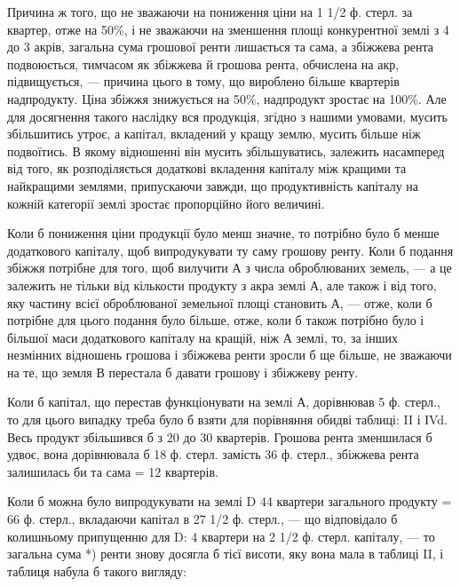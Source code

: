 Причина ж того, що не зважаючи на пониження ціни на 1 1/2 ф. стерл.
за квартер, отже на 50\%, і не зважаючи на зменшення площі конкурентної
землі з 4 до 3 акрів, загальна сума грошової ренти лишається та сама, а збіжжева
рента подвоюється, тимчасом як збіжжева й грошова рента, обчислена на акр, підвищується,
— причина цього в тому, що вироблено більше квартерів надпродукту.
Ціна збіжжя знижується на 50\%, надпродукт зростає на 100\%.
Але для досягнення такого наслідку вся продукція, згідно з нашими умовами,
мусить збільшитись утроє, а капітал, вкладений у кращу землю, мусить більше
ніж подвоїтись. В якому відношенні він мусить збільшуватись, залежить насамперед
від того, як розподіляється додаткові вкладення капіталу між кращими та
найкращими землями, припускаючи завжди, що продуктивність капіталу на
кожній категорії землі зростає пропорційно його величині.

Коли б пониження ціни продукції було менш значне, то потрібно було б
менше додаткового капіталу, щоб випродукувати ту саму грошову ренту. Коли б
подання збіжжя потрібне для того, щоб вилучити А з числа оброблюваних земель,
— а це залежить не тільки від кількости продукту з акра землі А, але
також і від того, яку частину всієї оброблюваної земельної площі становить А, —
отже, коли б потрібне для цього подання було більше, отже, коли б також
потрібно було і більшої маси додаткового капіталу на кращій, ніж А землі, то,
за інших незмінних відношень грошова і збіжжева ренти зросли б ще більше,
не зважаючи на те, що земля В перестала б давати грошову і збіжжеву ренту.

Коли б капітал, що перестав функціонувати на землі А, дорівнював 5 ф.
стерл., то для цього випадку треба було б взяти для порівняння обидві таблиці:
II і ІVd. Весь продукт збільшився б з 20 до 30 квартерів. Грошова рента
зменшилася б удвоє, вона дорівнювала б 18 ф. стерл. замість 36 ф. стерл.,
збіжжева рента залишилась би та сама = 12 квартерів.

Коли б можна було випродукувати на землі D 44 квартери загального
продукту = 66 ф. стерл., вкладаючи капітал в 27 1/2 ф. стерл., — що відповідало б
колишньому припущенню для D: 4 квартери на 2 1/2 ф. стерл. капіталу, —
то загальна сума *) ренти знову досягла б тієї висоти, яку вона мала в таблиці
II, і таблиця набула б такого вигляду:

